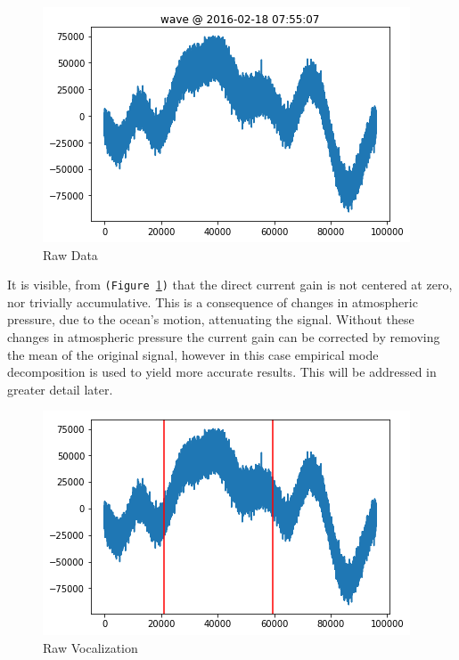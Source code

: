 \documentclass{article}
\begin{document}
\begin{multicols}{2}
\begin{figure}[H]
  \includegraphics[width=\columnwidth]{./rawwave.png}
  \caption{Raw Data}
  \label{fig:rawwav}

\end{figure}

It is visible, from \texttt{(Figure~\ref{fig:rawwav})} that the direct current gain is not centered at zero, nor trivially accumulative. This is a consequence of changes in atmospheric pressure, due to the ocean's motion, attenuating the signal. Without these changes in atmospheric pressure the current gain can be corrected by removing the mean of the original signal, however in this case empirical mode decomposition is used to yield more accurate results. This will be addressed in greater detail later.

\begin{figure}[H]
  \centering

  \includegraphics[width=\columnwidth]{./rawvocal.png}
  \caption{Raw Vocalization}
  \label{fig:rawvoc}


\end{figure}
\end{multicols}
\end{document}
